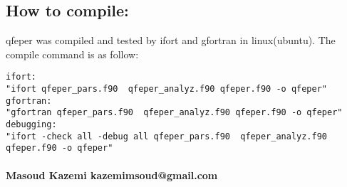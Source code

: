 \documentclass{article}
\begin{document}
\subsection*{How to compile:}
qfeper was compiled and tested by ifort and gfortran in linux(ubuntu).
The compile command is as follow:
\begin{verbatim}
ifort:
"ifort qfeper_pars.f90  qfeper_analyz.f90 qfeper.f90 -o qfeper"
gfortran:
"gfortran qfeper_pars.f90  qfeper_analyz.f90 qfeper.f90 -o qfeper"
debugging:
"ifort -check all -debug all qfeper_pars.f90  qfeper_analyz.f90 qfeper.f90 -o qfeper"
\end{verbatim}

\paragraph{Masoud Kazemi  kazemimsoud@gmail.com}
\end{document}
